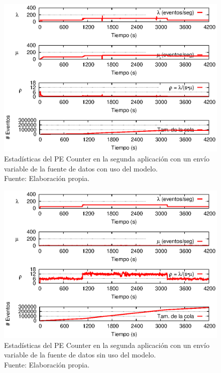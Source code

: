 \begin{figure}[!ht]
    \centering
    \captionsetup{justification=centering}
    \includegraphics[scale=1]{images/exp/app2/normal/cm/statusCounterPE.eps}
    \caption[Estad\'isticas del PE Counter en la segunda aplicaci\'on con un env\'io variable de la fuente de datos con uso del modelo.]{Estad\'isticas del PE Counter en la segunda aplicaci\'on con un env\'io variable de la fuente de datos con uso del modelo.\\Fuente: Elaboraci\'on propia.}
    \label{fig:app2-normal-statusCounterPE-cm}
\end{figure}

\begin{figure}[!ht]
    \centering
    \captionsetup{justification=centering}
    \includegraphics[scale=1]{images/exp/app2/normal/sm/statusCounterPE.eps}
    \caption[Estad\'isticas del PE Counter en la segunda aplicaci\'on con un env\'io variable de la fuente de datos sin uso del modelo.]{Estad\'isticas del PE Counter en la segunda aplicaci\'on con un env\'io variable de la fuente de datos sin uso del modelo.\\Fuente: Elaboraci\'on propia.}
    \label{fig:app2-normal-statusCounterPE-sm}
\end{figure}

